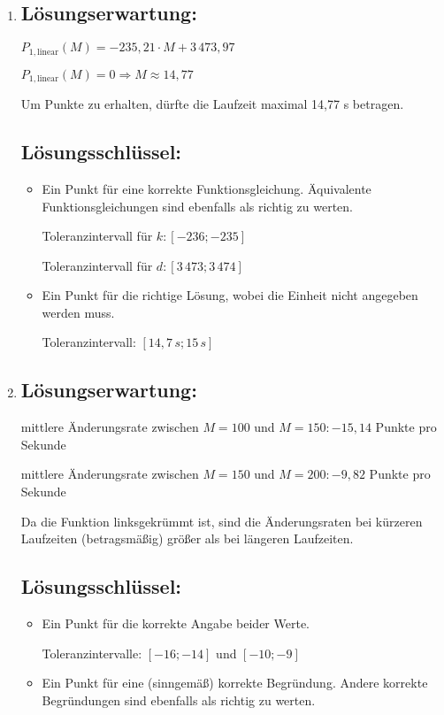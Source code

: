 \begin{langesbeispiel}
{\begin{enumerate}
\item \subsection{Lösungserwartung:}

	$P_{1,\text{linear}}(M)=-235,21\cdot M+3\,473,97$
	
	$P_{1,\text{linear}}(M)=0 \Rightarrow M\approx 14,77$\leer
	
	Um Punkte zu erhalten, dürfte die Laufzeit maximal 14,77 s betragen.
	\subsection{Lösungsschlüssel:}
	
\begin{itemize}
	\item Ein Punkt für eine korrekte Funktionsgleichung. Äquivalente Funktionsgleichungen sind ebenfalls als richtig zu werten. 
	
	Toleranzintervall für $k: [-236; -235]$ 
	
	Toleranzintervall für $d: [3\,473; 3\,474] $
	\item Ein Punkt für die richtige Lösung, wobei die Einheit nicht angegeben werden muss.  
	
	Toleranzintervall: $[14,7\,s; 15\,s]$

\end{itemize}

\item \subsection{Lösungserwartung:}

	mittlere Änderungsrate zwischen $M=100$ und $M=150:-15,14$ Punkte pro Sekunde 
	
	mittlere Änderungsrate zwischen $M=150$ und $M=200:-9,82$ Punkte pro Sekunde
 
Da die Funktion linksgekrümmt ist, sind die Änderungsraten bei kürzeren Laufzeiten (betragsmäßig) größer als bei längeren Laufzeiten.
	\subsection{Lösungsschlüssel:}
	
\begin{itemize}
	\item   Ein Punkt für die korrekte Angabe beider Werte.  
	
	Toleranzintervalle: $[-16;-14]$ und $[-10;-9]$
	\item Ein Punkt für eine (sinngemäß) korrekte Begründung. Andere korrekte Begründungen sind ebenfalls als richtig zu werten.

\end{itemize}
\end{enumerate}}
		\end{langesbeispiel}